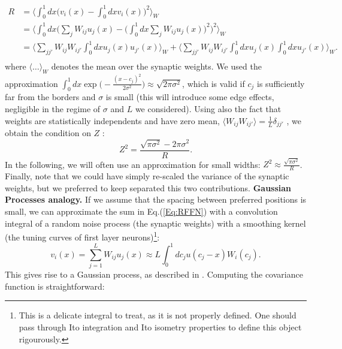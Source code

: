 \documentclass[a4paper]{article}
\begin{document}
\begin{equation}
\begin{split}
R&= \Big\langle \int_0^1 dx \Big(v_i(x) - \int_0^1 dx v_i(x) \Big)^2 \Big\rangle_W  \\
&=\Big \langle \int_0^1 dx \Big(\sum_j W_{ij} u_j(x) -  \big(\int_0^1 dx  \sum_j W_{ij} u_j(x) \big)^2 \Big)^2 \Big\rangle_W \\
&= \Big\langle \sum_{jj'} W_{ij} W_{ij'}\int_0^1 dx u_j(x)u_{j'}(x)\Big\rangle_W +\Big\langle \sum_{jj'}W_{ij}W_{ij'}\int_0^1 dx u_j(x) \int_0^1 dx u_{j'}(x)\Big \rangle_W.\\
 \end{split}
\end{equation}
where $\langle \dots \rangle_W$ denotes the mean over the synaptic weights.
We used the approximation  $\int_0^1 dx \exp \Big(-\frac{(x-c_j)^2}{2 \sigma^2}\Big) \approx \sqrt{2\pi \sigma^2}$, which is valid if $c_j$ is sufficiently far from the borders and $\sigma$ is small (this will introduce some edge effects, negligible in the regime of $\sigma$ and $L$ we considered). Using also the fact that weights are statistically independents and have zero mean, $\langle W_{ij}W_{ij'} \rangle = \frac{1}{L}\delta_{jj'}$ , we obtain the condition on $Z$ :
\begin{equation}
Z^2 = \frac{\sqrt{\pi\sigma^2} - 2\pi\sigma^2}{R}.
\end{equation}In the following, we will often use an approximation for small widths: $Z^2 \approx \frac{\sqrt{\pi\sigma^2}}{R}$. Finally, note that we could have simply re-scaled the variance of the synaptic weights, but we preferred to keep separated this two contributions.
\newline
\newline
\textbf{Gaussian Processes analogy.} If we assume that the spacing between preferred positions is small, we can approximate the sum in Eq.(\ref{Eq:RFFN}) with a convolution integral of a random noise process (the synaptic weights) with  a smoothing kernel (the tuning curves of first layer neurons)\footnote{This is a delicate integral to treat, as it is not properly defined. One should pass through Ito integration and Ito isometry properties to define this object rigourously.}:
\begin{equation*}
 v_i(x) =\sum_{j=1}^L W_{ij}u_j(x) \approx L \int_0^1 dc_j u(c_j-x) W_i(c_j).
\end{equation*}This gives rise to a Gaussian process, as described in \cite{Higdon2002SpaceConvolutionsb,Rasmussen2004GaussianLearning}. Computing the covariance function is straightforward:
\end{document}
